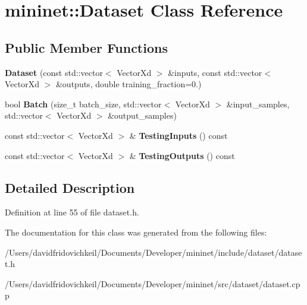 \hypertarget{classmininet_1_1_dataset}{}\section{mininet\+:\+:Dataset Class Reference}
\label{classmininet_1_1_dataset}
\subsection*{Public Member Functions}
\begin{DoxyCompactItemize}
\item 
\hypertarget{classmininet_1_1_dataset_a79c4a277bf54f19147e340f6d409443e}{}\label{classmininet_1_1_dataset_a79c4a277bf54f19147e340f6d409443e} 
{\bfseries Dataset} (const std\+::vector$<$ Vector\+Xd $>$ \&inputs, const std\+::vector$<$ Vector\+Xd $>$ \&outputs, double training\+\_\+fraction=0.)
\item 
\hypertarget{classmininet_1_1_dataset_a537e957564a9a742a41dc5da2cc64f9e}{}\label{classmininet_1_1_dataset_a537e957564a9a742a41dc5da2cc64f9e} 
bool {\bfseries Batch} (size\+\_\+t batch\+\_\+size, std\+::vector$<$ Vector\+Xd $>$ \&input\+\_\+samples, std\+::vector$<$ Vector\+Xd $>$ \&output\+\_\+samples)
\item 
\hypertarget{classmininet_1_1_dataset_a9d1fa0b517a7f478ac3ffc3fd63b669d}{}\label{classmininet_1_1_dataset_a9d1fa0b517a7f478ac3ffc3fd63b669d} 
const std\+::vector$<$ Vector\+Xd $>$ \& {\bfseries Testing\+Inputs} () const
\item 
\hypertarget{classmininet_1_1_dataset_a285f104f5af9647180b19acc95e1b5fa}{}\label{classmininet_1_1_dataset_a285f104f5af9647180b19acc95e1b5fa} 
const std\+::vector$<$ Vector\+Xd $>$ \& {\bfseries Testing\+Outputs} () const
\end{DoxyCompactItemize}


\subsection{Detailed Description}


Definition at line 55 of file dataset.\+h.



The documentation for this class was generated from the following files\+:\begin{DoxyCompactItemize}
\item 
/\+Users/davidfridovichkeil/\+Documents/\+Developer/mininet/include/dataset/dataset.\+h\item 
/\+Users/davidfridovichkeil/\+Documents/\+Developer/mininet/src/dataset/dataset.\+cpp\end{DoxyCompactItemize}
